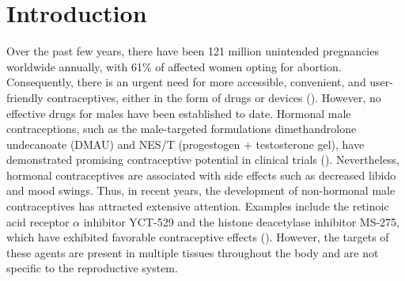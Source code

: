 \documentclass[unnumsec,webpdf,contemporary,large]{oup-authoring-template}%
\theoremstyle{thmstyleone}%
\theoremstyle{thmstyletwo}%
\theoremstyle{thmstylethree}%
\begin{document}

\maketitle



\section{Introduction}

Over the past few years, there have been 121 million unintended pregnancies worldwide annually, with 61\% of affected women opting for abortion. Consequently, there is an urgent need for more accessible, convenient, and user-friendly contraceptives, either in the form of drugs or devices (\citealt{1}). However, no effective drugs for males have been established to date. Hormonal male contraceptions, such as the male-targeted formulations dimethandrolone undecanoate (DMAU) and NES/T (progestogen + testosterone gel), have demonstrated promising contraceptive potential in clinical trials (\citealt{2,3}). Nevertheless, hormonal contraceptives are associated with side effects such as decreased libido and mood swings. Thus, in recent years, the development of non-hormonal male contraceptives has attracted extensive attention. Examples include the retinoic acid receptor $\alpha$ inhibitor YCT-529 and the histone deacetylase inhibitor MS-275, which have exhibited favorable contraceptive effects (\citealt{4,5}). However, the targets of these agents are present in multiple tissues throughout the body and are not specific to the reproductive system.
\end{document}
